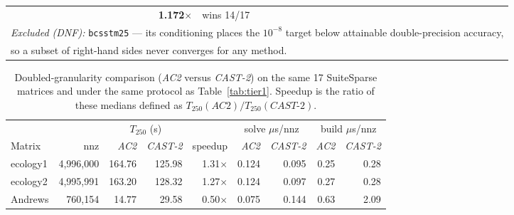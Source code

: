 \documentclass{article}
\newcommand{\CASTtwo}{\textit{CAST-2}\xspace}
\newcommand{\ACtwo}{\textit{AC2}\xspace}
\newcommand{\1}{\mathbbm{1}}
\theoremstyle{plain}
\begin{document}
\begin{table}[!t]
\begin{tabular}{l r rr r rr rr}
& \textbf{1.172$\times$} & \multicolumn{4}{l}{wins 14/17} \\

\multicolumn{9}{l}{\emph{Excluded (DNF):} \texttt{bcsstm25} --- its conditioning places the $10^{-8}$ target below attainable double-precision accuracy,} \\
\multicolumn{9}{l}{ so a subset of right-hand sides never converges for any method.} \\

\bottomrule

\end{tabular}

\end{table}

 

\begin{table}[!t]

\centering

\caption{Doubled-granularity comparison (\ACtwo versus \CASTtwo) on
the same 17 SuiteSparse matrices and under the same protocol as
Table~\ref{tab:tier1}. Speedup is the ratio of these medians defined as
$T_{250}(\ACtwo)/T_{250}(\CASTtwo)$.}

\label{tab:tier2}

\small

\begin{tabular}{l r rr r rr rr}

\toprule

& & \multicolumn{2}{c}{$T_{250}$ (s)} & &

\multicolumn{2}{c}{solve $\mu$s/nnz} &

\multicolumn{2}{c}{build $\mu$s/nnz} \\

\cmidrule(lr){3-4}\cmidrule(lr){6-7}\cmidrule(lr){8-9}

Matrix & nnz & \ACtwo & \CASTtwo & speedup &

\ACtwo & \CASTtwo & \ACtwo & \CASTtwo \\

\midrule

ecology1         & 4{,}996{,}000 & 164.76 & 125.98 & 1.31$\times$ & 0.124 & 0.095 & 0.25 & 0.28 \\

ecology2         & 4{,}995{,}991 & 163.20 & 128.32 & 1.27$\times$ & 0.124 & 0.097 & 0.27 & 0.28 \\

Andrews          &   760{,}154 &  14.77 &  29.58 & 0.50$\times$ & 0.075 & 0.144 & 0.63 & 2.09 \\


\end{tabular}
\end{table}
\end{document}
